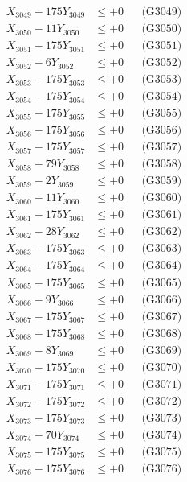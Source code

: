 \documentclass[a4paper,10pt]{article}
\begin{document}
{\begin{align}
X_{3049} - 175Y_{3049} &\leq +0 && \text{(G3049)} \\
X_{3050} - 11Y_{3050} &\leq +0 && \text{(G3050)} \\
\allowbreak
X_{3051} - 175Y_{3051} &\leq +0 && \text{(G3051)} \\
X_{3052} - 6Y_{3052} &\leq +0 && \text{(G3052)} \\
X_{3053} - 175Y_{3053} &\leq +0 && \text{(G3053)} \\
X_{3054} - 175Y_{3054} &\leq +0 && \text{(G3054)} \\
X_{3055} - 175Y_{3055} &\leq +0 && \text{(G3055)} \\
X_{3056} - 175Y_{3056} &\leq +0 && \text{(G3056)} \\
X_{3057} - 175Y_{3057} &\leq +0 && \text{(G3057)} \\
X_{3058} - 79Y_{3058} &\leq +0 && \text{(G3058)} \\
X_{3059} - 2Y_{3059} &\leq +0 && \text{(G3059)} \\
X_{3060} - 11Y_{3060} &\leq +0 && \text{(G3060)} \\
\allowbreak
X_{3061} - 175Y_{3061} &\leq +0 && \text{(G3061)} \\
X_{3062} - 28Y_{3062} &\leq +0 && \text{(G3062)} \\
X_{3063} - 175Y_{3063} &\leq +0 && \text{(G3063)} \\
X_{3064} - 175Y_{3064} &\leq +0 && \text{(G3064)} \\
X_{3065} - 175Y_{3065} &\leq +0 && \text{(G3065)} \\
X_{3066} - 9Y_{3066} &\leq +0 && \text{(G3066)} \\
X_{3067} - 175Y_{3067} &\leq +0 && \text{(G3067)} \\
X_{3068} - 175Y_{3068} &\leq +0 && \text{(G3068)} \\
X_{3069} - 8Y_{3069} &\leq +0 && \text{(G3069)} \\
X_{3070} - 175Y_{3070} &\leq +0 && \text{(G3070)} \\
\allowbreak
X_{3071} - 175Y_{3071} &\leq +0 && \text{(G3071)} \\
X_{3072} - 175Y_{3072} &\leq +0 && \text{(G3072)} \\
X_{3073} - 175Y_{3073} &\leq +0 && \text{(G3073)} \\
X_{3074} - 70Y_{3074} &\leq +0 && \text{(G3074)} \\
X_{3075} - 175Y_{3075} &\leq +0 && \text{(G3075)} \\
X_{3076} - 175Y_{3076} &\leq +0 && \text{(G3076)} \\

\end{align}}
\end{document}
